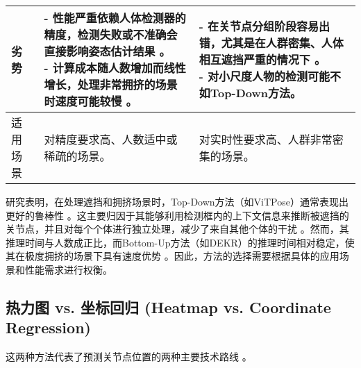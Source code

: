 \documentclass[12pt,a4paper]{article}
\begin{document}
\begin{table}[htbp]
\begin{tabularx}{\textwidth}{|l|>{\raggedright\arraybackslash}X|>{\raggedright\arraybackslash}X|}
\midrule
劣势 & \makecell[tl]{- 性能严重依赖人体检测器的精度，检测失败或不准确会直接影响姿态估计结果 \cite{Zhang2024HPEReview}。\\ - 计算成本随人数增加而线性增长，处理非常拥挤的场景时速度可能较慢 \cite{Li2019CrowdPose}。} & \makecell[tl]{- 在关节点分组阶段容易出错，尤其是在人群密集、人体相互遮挡严重的情况下 \cite{Andriluka2014MPII}。\\ - 对小尺度人物的检测可能不如Top-Down方法。} \\
\midrule
适用场景 & 对精度要求高、人数适中或稀疏的场景。 & 对实时性要求高、人群非常密集的场景。 \\
\bottomrule
\end{tabularx} %
\end{table}

研究表明，在处理遮挡和拥挤场景时，Top-Down方法（如ViTPose）通常表现出更好的鲁棒性 \cite{Li2019CrowdPose}。这主要归因于其能够利用检测框内的上下文信息来推断被遮挡的关节点，并且对每个个体进行独立处理，减少了来自其他个体的干扰 \cite{Li2019CrowdPose}。然而，其推理时间与人数成正比，而Bottom-Up方法（如DEKR）的推理时间相对稳定，使其在极度拥挤的场景下具有速度优势 \cite{Li2019CrowdPose}。因此，方法的选择需要根据具体的应用场景和性能需求进行权衡。

\subsection{热力图 vs. 坐标回归 (Heatmap vs. Coordinate Regression)}
这两种方法代表了预测关节点位置的两种主要技术路线 \cite{Toshev2014DeepPose}。
\end{document}
